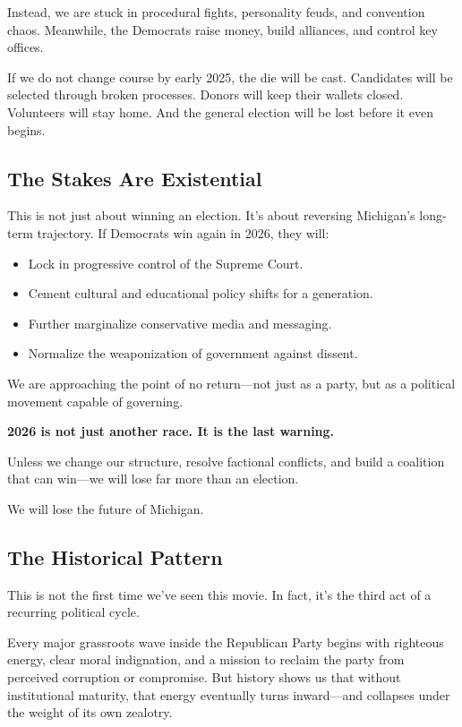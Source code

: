 Instead, we are stuck in procedural fights, personality feuds, and convention chaos. Meanwhile, the Democrats raise money, build alliances, and control key offices.

If we do not change course by early 2025, the die will be cast. Candidates will be selected through broken processes. Donors will keep their wallets closed. Volunteers will stay home. And the general election will be lost before it even begins.

\subsection{The Stakes Are Existential}
This is not just about winning an election. It’s about reversing Michigan’s long-term trajectory. If Democrats win again in 2026, they will:
\begin{itemize}
\item Lock in progressive control of the Supreme Court.
\item Cement cultural and educational policy shifts for a generation.
\item Further marginalize conservative media and messaging.
\item Normalize the weaponization of government against dissent.
\end{itemize}

We are approaching the point of no return—not just as a party, but as a political movement capable of governing.

\textbf{2026 is not just another race. It is the last warning.}

Unless we change our structure, resolve factional conflicts, and build a coalition that can win—we will lose far more than an election.

We will lose the future of Michigan.



\subsection{The Historical Pattern}

This is not the first time we’ve seen this movie. In fact, it’s the third act of a recurring political cycle.

Every major grassroots wave inside the Republican Party begins with righteous energy, clear moral indignation, and a mission to reclaim the party from perceived corruption or compromise. But history shows us that without institutional maturity, that energy eventually turns inward—and collapses under the weight of its own zealotry.

